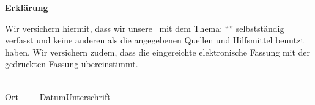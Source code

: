 

\newpage
\thispagestyle{empty}
\begin{framed}
\begin{center}
\Large\bfseries Erklärung
\end{center}
\medskip
\noindent
Wir versichern hiermit, dass wir unsere \Was\ mit
dem Thema: \enquote{\Titel} selbstständig verfasst und keine anderen als die angegebenen Quellen und
Hilfsmittel benutzt haben. Wir versichern zudem, dass die eingereichte elektronische Fassung mit der
gedruckten Fassung übereinstimmt.

\vspace{3cm}
\noindent
\underline{\hspace{4cm}}\hfill\underline{\hspace{6cm}}\\
Ort~~~~~Datum\hfill Unterschrift\hspace{4cm}
\end{framed}


\vfill

\endinput
